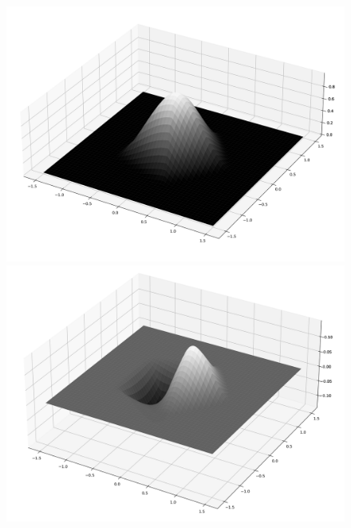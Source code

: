 \documentclass[fleqn, bachelor,subf,12pt,notitlepage]{article}
\begin{document}
\begin{figure}[H]
  \centering
  \begin{minipage}[b]{0.43\textwidth}
    \includegraphics[width=\textwidth]{images/hermite_cubic_func}
  \end{minipage}
  \hfill
  \begin{minipage}[b]{0.43\textwidth}
    \includegraphics[width=\textwidth]{images/hermite_cubic_fx}
  \end{minipage}
\\
  \begin{minipage}[b]{0.43\textwidth}

\end{minipage}
\end{figure}
\end{document}
